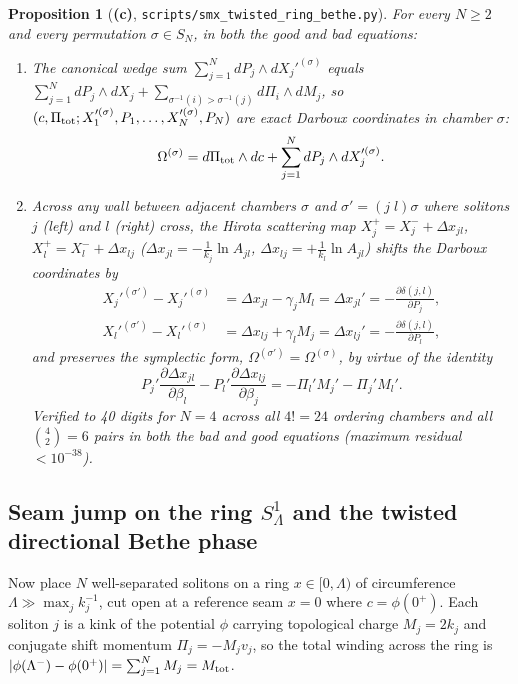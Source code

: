 \documentclass[11pt,a4paper]{article}
\newcommand{\Lc}{\textsf{\textbf{(c)}}}
\newcommand{\smxring}{\texttt{scripts/\allowbreak smx\_\allowbreak twisted\_\allowbreak ring\_\allowbreak bethe.py}}
\newtheorem{proposition}{Proposition}[section]
\theoremstyle{remark}
\begin{document}
\begin{proposition}[\Lc, \smxring]\label{prop:N_symp}
For every $N\ge 2$ and every permutation $\sigma\in S_N$, in both the good and bad equations:
\begin{enumerate}
\item The canonical wedge sum $\sum_{j=1}^N dP_j\wedge dX_j'^{(\sigma)}$ equals $\sum_{j=1}^N dP_j\wedge dX_j+\sum_{\sigma^{-1}(i)>\sigma^{-1}(j)}d\Pi_i\wedge dM_j$, so $(c,\Pi_{\rm tot};X_1'^{(\sigma)},P_1,\dots,X_N'^{(\sigma)},P_N)$ are exact Darboux coordinates in chamber $\sigma$:
\begin{equation}\label{eq:Omega_Darboux}
\Omega^{(\sigma)}=d\Pi_{\rm tot}\wedge dc+\sum_{j=1}^N dP_j\wedge dX_j'^{(\sigma)}.
\end{equation}
\item Across any wall between adjacent chambers $\sigma$ and $\sigma'=(j\;l)\sigma$ where solitons $j$ (left) and $l$ (right) cross, the Hirota scattering map $X_j^+=X_j^-+\Delta x_{jl}$, $X_l^+=X_l^-+\Delta x_{lj}$ ($\Delta x_{jl}=-\frac{1}{k_j}\ln A_{jl}$, $\Delta x_{lj}=+\frac{1}{k_l}\ln A_{jl}$) shifts the Darboux coordinates by
\begin{align}
X_j'^{(\sigma')}-X_j'^{(\sigma)}&=\Delta x_{jl}-\gamma_j M_l=\Delta x_{jl}'=-\frac{\partial\delta(j,l)}{\partial P_j},\label{eq:Darboux_wall}\\
X_l'^{(\sigma')}-X_l'^{(\sigma)}&=\Delta x_{lj}+\gamma_l M_j=\Delta x_{lj}'=-\frac{\partial\delta(j,l)}{\partial P_l},\nonumber
\end{align}
and preserves the symplectic form, $\Omega^{(\sigma')}=\Omega^{(\sigma)}$, by virtue of the identity
\begin{equation}\label{eq:symp_wall_id}
P_j'\frac{\partial\Delta x_{jl}}{\partial\beta_l}-P_l'\frac{\partial\Delta x_{lj}}{\partial\beta_j}=-\Pi_l' M_j'-\Pi_j' M_l'.
\end{equation}
Verified to 40 digits for $N=4$ across all $4!=24$ ordering chambers and all $\binom{4}{2}=6$ pairs in both the bad and good equations (maximum residual $<10^{-38}$).
\end{enumerate}
\end{proposition}

\subsection{Seam jump on the ring \texorpdfstring{$S^1_\Lambda$}{S\^{}1\_Lambda} and the twisted directional Bethe phase}
Now place $N$ well-separated solitons on a ring $x\in[0,\Lambda)$ of circumference $\Lambda\gg\max_j k_j^{-1}$, cut open at a reference seam $x=0$ where $c=\phi(0^+)$. Each soliton $j$ is a kink of the potential $\phi$ carrying topological charge $M_j=2k_j$ and conjugate shift momentum $\Pi_j=-M_j v_j$, so the total winding across the ring is $|\phi(\Lambda^-)-\phi(0^+)|=\sum_{j=1}^N M_j=M_{\rm tot}$.
\end{document}
